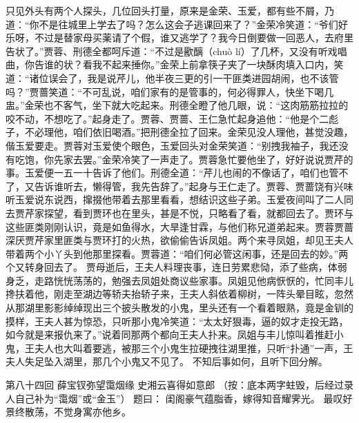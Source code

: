 \documentclass[12pt,oneside]{book}
\begin{document}
只见外头有两个人探头，几位回头打量，原来是金荣、玉爱，都有些不屑，乃道：“你不是往城里上学去了吗？怎么这会子逃课回来了？”金荣冷笑道：“爷们好乐呀，不过是替家母买薬请了个假，谁又逃学了？我今日倒要做一回恶人，去府里告状了。”贾蓉、刑德全都呵斥道：“不过是歠醨（chuò lí）了几杯，又没有听戏唱曲，你告谁的状？看我不起来捶你。”金荣上前拿筷子夹了一块酥肉填入口内，笑道：“诸位误会了，我是说芹儿，他半夜三更的引一干匪类进园胡闹，也不该管吗？”贾蔷笑道：“不可乱说，咱们家有的是管事的，何必得罪人，快坐下喝几盅。”金荣也不客气，坐下就大吃起来。刑德全瞪了他几眼，说：“这肉筋筋拉拉的咬不动，不想吃了。”起身走了。贾蓉、贾蔷、王仁急忙起身追他：“他是个二彪子，不必理他，咱们依旧喝酒。”把刑德全拉了回来。金荣见没人理他，甚觉没趣，偕玉爱要走。贾蓉对玉爱使个眼色，玉爱回头对金荣笑道：“别拽我袖子，我还没有吃饱，你先家去罢。”金荣冷笑了一声走了。贾蓉急忙要他坐了，好好说说贾芹的事。玉爱便一五一十告诉了他们。刑德全道：“芹儿也闹的不像话了，咱们也管不了，又告诉谁听去，懒得管，我先告辞了。”起身与王仁走了。贾蓉、贾蔷饶有兴味听玉爱说东说西，撺掇他带着去那里看看，想结识这些子弟。玉爱夜间叫了二人同去贾芹家探望，看到贾环也在里头，甚是不悦，只略看了看，就都回去了。贾环与这些匪类刚刚认识，竟是如鱼得水，大旱逢甘霖，与他们称兄道弟起来。贾蓉贾蔷深厌贾芹家里匪类与贾环打的火热，欲偷偷告诉凤姐。两个来寻凤姐，却见王夫人带着两个小丫头到他那里探看。贾蓉道：“咱们何必管这闲事，还是回去的妙。”两个又转身回去了。
贾母逝后，王夫人料理丧事，连日劳累悲恸，添了些病，体弱身乏，走路恍恍荡荡的，勉强去凤姐处商议些家事。凤姐见他病恹恹的，忙同丰儿搀扶着他，刚走至湖边等轿夫抬轿子来，王夫人斜依着柳树，一阵头晕目眩，忽然从那湖里影影绰绰现出三个披头散发的小鬼，里头还有一个看着眼熟，竟是金钏的摸样，王夫人甚为惊恐，只听那小鬼冷笑道：“太太好狠毒，逼的奴才走投无路，如今就是来报仇来了。”说着同那两个都向王夫人扑来。凤姐与丰儿惊叫着推赶小鬼，王夫人也大叫着要逃，被那三个小鬼生拉硬拽往湖里推，只听“扑通”一声，王夫人失足坠入湖里，那几个小鬼又不见了。
不知后事如何，且听下回分解。
 
第八十四回 薛宝钗弥望霭烟缘 史湘云喜得如意郎
（按：底本两字蛀毁，后经过录人自己补为“霭烟”或“金玉”）
题曰：
闺阁豪气蕴脂香，嫁得知音耀霁光。
最叹好景终散荡，不觉身寓亦他乡。
\end{document}
